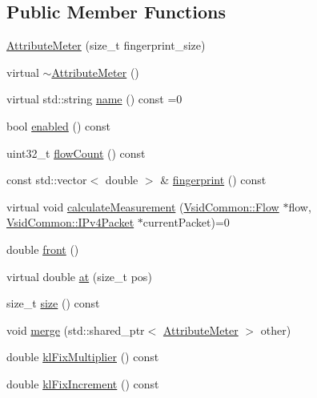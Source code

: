 \subsection*{Public Member Functions}
\begin{DoxyCompactItemize}
\item 
\hyperlink{class_vsid_1_1_attribute_meter_ae8a9a8b485b2dbf676195bc65bdb746e}{Attribute\-Meter} (size\-\_\-t fingerprint\-\_\-size)
\item 
virtual \hyperlink{class_vsid_1_1_attribute_meter_a5a93fb5778d26502690f63fae32627b8}{$\sim$\-Attribute\-Meter} ()
\item 
virtual std\-::string \hyperlink{class_vsid_1_1_attribute_meter_a24d5a7141e89e948c05edf8f70be8c53}{name} () const =0
\item 
bool \hyperlink{class_vsid_1_1_attribute_meter_a6c92af9d2886218640cbe744d4026d84}{enabled} () const 
\item 
uint32\-\_\-t \hyperlink{class_vsid_1_1_attribute_meter_aba7d1166ff90d06fee99f8bb7a453463}{flow\-Count} () const 
\item 
const std\-::vector$<$ double $>$ \& \hyperlink{class_vsid_1_1_attribute_meter_a358c91d8ae6c3e7675188ed990f78a2e}{fingerprint} () const 
\item 
virtual void \hyperlink{class_vsid_1_1_attribute_meter_a5b7adf4a8e493bd24eb027221518e713}{calculate\-Measurement} (\hyperlink{class_vsid_common_1_1_flow}{Vsid\-Common\-::\-Flow} $\ast$flow, \hyperlink{class_vsid_common_1_1_i_pv4_packet}{Vsid\-Common\-::\-I\-Pv4\-Packet} $\ast$current\-Packet)=0
\item 
double \hyperlink{class_vsid_1_1_attribute_meter_a5ed6082ea1e8e69940f2f87e4645820d}{front} ()
\item 
virtual double \hyperlink{class_vsid_1_1_attribute_meter_a3b067be638ae613a732fa090c07c5e71}{at} (size\-\_\-t pos)
\item 
size\-\_\-t \hyperlink{class_vsid_1_1_attribute_meter_a6243f852b5ef8e24d8015e2018037d2c}{size} () const 
\item 
void \hyperlink{class_vsid_1_1_attribute_meter_a484fee360033da67cbf4a86fcb241ee4}{merge} (std\-::shared\-\_\-ptr$<$ \hyperlink{class_vsid_1_1_attribute_meter}{Attribute\-Meter} $>$ other)
\item 
double \hyperlink{class_vsid_1_1_attribute_meter_a15ba5f2d64b769614ec6473e855da5cb}{kl\-Fix\-Multiplier} () const 
\item 
double \hyperlink{class_vsid_1_1_attribute_meter_a83868edd6fa204ece7cefbd6182f4cfa}{kl\-Fix\-Increment} () const 
\end{DoxyCompactItemize}
